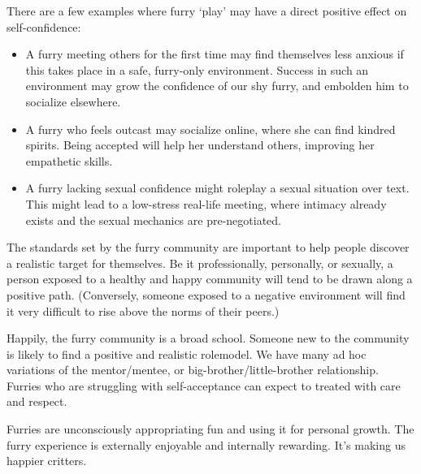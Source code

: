 There are a few examples where furry `play' may have a direct positive effect on self-confidence:

\begin{itemize}
  \item A furry meeting others for the first time may find themselves less anxious if this takes place in a safe, furry-only environment. Success in such an environment may grow the confidence of our shy furry, and embolden him to socialize elsewhere.
  \item A furry who feels outcast may socialize online, where she can find kindred spirits. Being accepted will help her understand others, improving her empathetic skills.
  \item A furry lacking sexual confidence might roleplay a sexual situation over text. This might lead to a low-stress real-life meeting, where intimacy already exists and the sexual mechanics are pre-negotiated.
\end{itemize}

The standards set by the furry community are important to help people discover a realistic target for themselves. Be it professionally, personally, or sexually, a person exposed to a healthy and happy community will tend to be drawn along a positive path. (Conversely, someone exposed to a negative environment will find it very difficult to rise above the norms of their peers.)

Happily, the furry community is a broad school. Someone new to the community is likely to find a positive and realistic rolemodel. We have many ad hoc variations of the mentor/mentee, or big-brother/little-brother relationship. Furries who are struggling with self-acceptance can expect to treated with care and respect.

Furries are unconsciously appropriating fun and using it for personal growth. The furry experience is externally enjoyable and internally rewarding. It's making us happier critters.
